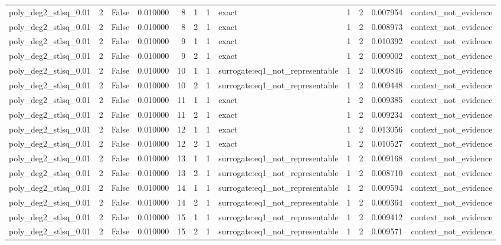 \begin{tabular}{lrrrrrrlrrrl}
poly\_deg2\_stlsq\_0.01 & 2 & False & 0.010000 & 8 & 1 & 1 & exact & 1 & 2 & 0.007954 & context\_not\_evidence \\
poly\_deg2\_stlsq\_0.01 & 2 & False & 0.010000 & 8 & 2 & 1 & exact & 1 & 2 & 0.008973 & context\_not\_evidence \\
poly\_deg2\_stlsq\_0.01 & 2 & False & 0.010000 & 9 & 1 & 1 & exact & 1 & 2 & 0.010392 & context\_not\_evidence \\
poly\_deg2\_stlsq\_0.01 & 2 & False & 0.010000 & 9 & 2 & 1 & exact & 1 & 2 & 0.009002 & context\_not\_evidence \\
poly\_deg2\_stlsq\_0.01 & 2 & False & 0.010000 & 10 & 1 & 1 & surrogate:eq1\_not\_representable & 1 & 2 & 0.009846 & context\_not\_evidence \\
poly\_deg2\_stlsq\_0.01 & 2 & False & 0.010000 & 10 & 2 & 1 & surrogate:eq1\_not\_representable & 1 & 2 & 0.009448 & context\_not\_evidence \\
poly\_deg2\_stlsq\_0.01 & 2 & False & 0.010000 & 11 & 1 & 1 & exact & 1 & 2 & 0.009385 & context\_not\_evidence \\
poly\_deg2\_stlsq\_0.01 & 2 & False & 0.010000 & 11 & 2 & 1 & exact & 1 & 2 & 0.009234 & context\_not\_evidence \\
poly\_deg2\_stlsq\_0.01 & 2 & False & 0.010000 & 12 & 1 & 1 & exact & 1 & 2 & 0.013056 & context\_not\_evidence \\
poly\_deg2\_stlsq\_0.01 & 2 & False & 0.010000 & 12 & 2 & 1 & exact & 1 & 2 & 0.010527 & context\_not\_evidence \\
poly\_deg2\_stlsq\_0.01 & 2 & False & 0.010000 & 13 & 1 & 1 & surrogate:eq1\_not\_representable & 1 & 2 & 0.009168 & context\_not\_evidence \\
poly\_deg2\_stlsq\_0.01 & 2 & False & 0.010000 & 13 & 2 & 1 & surrogate:eq1\_not\_representable & 1 & 2 & 0.008710 & context\_not\_evidence \\
poly\_deg2\_stlsq\_0.01 & 2 & False & 0.010000 & 14 & 1 & 1 & surrogate:eq1\_not\_representable & 1 & 2 & 0.009594 & context\_not\_evidence \\
poly\_deg2\_stlsq\_0.01 & 2 & False & 0.010000 & 14 & 2 & 1 & surrogate:eq1\_not\_representable & 1 & 2 & 0.009364 & context\_not\_evidence \\
poly\_deg2\_stlsq\_0.01 & 2 & False & 0.010000 & 15 & 1 & 1 & surrogate:eq1\_not\_representable & 1 & 2 & 0.009412 & context\_not\_evidence \\
poly\_deg2\_stlsq\_0.01 & 2 & False & 0.010000 & 15 & 2 & 1 & surrogate:eq1\_not\_representable & 1 & 2 & 0.009571 & context\_not\_evidence \\

\end{tabular}
